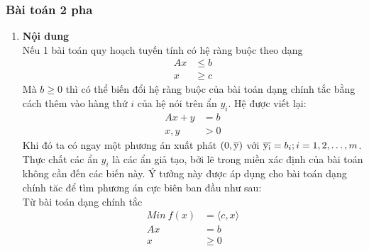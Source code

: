 \documentclass{article}
\begin{document}
            \subsubsection{Bài toán 2 pha}
                \begin{enumerate}
                    \item \textbf{Nội dung} \\
                        Nếu 1 bài toán quy hoạch tuyến tính có hệ ràng buộc theo dạng
                            \begin{equation}
                                \begin{split}
                                    Ax &\leq b \\
                                    x &\geq c
                                \end{split}
                            \end{equation}
                        Mà $b \geq 0$ thì có thể biến đổi hệ ràng buộc của bài toán dạng chính tắc bằng cách thêm vào hàng thứ $i$ của hệ nói trên ẩn $y_i$. Hệ được viết lại:
                            \begin{equation}
                                \begin{split}
                                    Ax+y&=b\\
                                    x,y &> 0
                                \end{split}
                            \end{equation}
                        Khi đó ta có ngay một phương án xuất phát $(0,\overline{\rm y})$ với $\overline{\rm y_i} = b_i ; i=1,2,\ldots,m$. \\
                        Thực chất các ẩn $y_i$ là các ẩn giả tạo, bởi lẽ trong miền xác định của bài toán không cần đến các biến này. Ý tưởng này được áp dụng cho bài toán dạng chính tăc để tìm phương án cực biên ban đầu như sau: \\
                        Từ bài toán dạng chính tắc
                            \begin{equation} \label{2.1}
                                \begin{split}
                                    Min \: f(x) &= \langle c,x \rangle \\
                                    Ax &= b \\
                                    x &\geq 0
                                \end{split}

\end{equation}
\end{enumerate}
\end{document}
